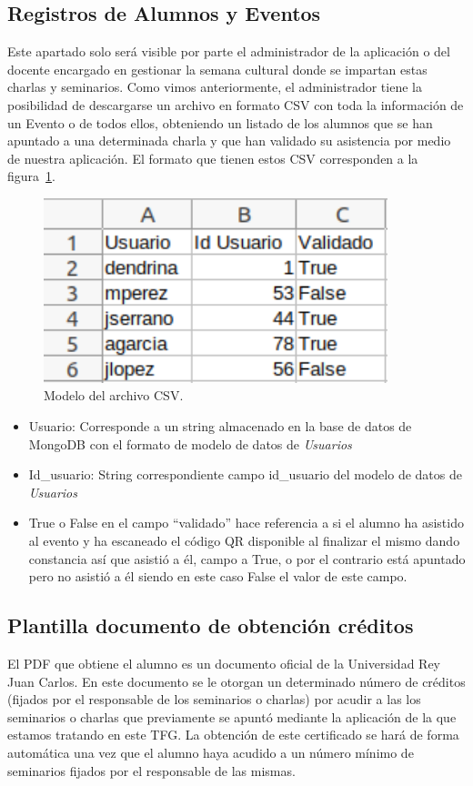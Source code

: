 \documentclass[a4paper, 12pt]{book}
\begin{document}
\subsection{Registros de Alumnos y Eventos}
	Este apartado solo será visible por parte el administrador de la aplicación o del docente encargado en gestionar la semana cultural donde se impartan estas charlas y seminarios. Como vimos anteriormente, el administrador tiene la posibilidad de descargarse un archivo en formato CSV con toda la información de un Evento o de todos ellos, obteniendo un listado de los alumnos que se han apuntado a una determinada charla y que han validado su asistencia por medio de nuestra aplicación.
	El formato que tienen estos CSV corresponden a la figura~\ref{fig:CSVAlumnos}.
	\begin{figure}[h!]
  	\centering
  	\includegraphics[width=10cm, keepaspectratio]{img/CSVAlumnos.png}
  	\caption{Modelo del archivo CSV.}\label{fig:CSVAlumnos}
	\end{figure}
	\begin{itemize}
		\item Usuario: Corresponde a un string almacenado en la base de datos de MongoDB con el formato de modelo de datos de \textit{Usuarios}
		\item Id\_usuario: String correspondiente campo id\_usuario del modelo de datos de \textit{Usuarios}
		\item True o False en el campo ``validado'' hace referencia a si el alumno ha asistido al evento y ha escaneado el código QR disponible al finalizar el mismo dando constancia así que asistió a él, campo a True, o por el contrario está apuntado pero no asistió a él siendo en este caso False el valor de este campo.
	\end{itemize}
	

\subsection{Plantilla documento de obtención créditos}
	El PDF que obtiene el alumno es un documento oficial de la Universidad Rey Juan Carlos. En este documento se le otorgan un determinado número de créditos (fijados por el responsable de los seminarios o charlas) por acudir a las los seminarios o charlas que previamente se apuntó mediante la aplicación de la que estamos tratando en este TFG. La obtención de este certificado se hará de forma automática una vez que el alumno haya acudido a un número mínimo de seminarios fijados por el responsable de las mismas. 
\end{document}
